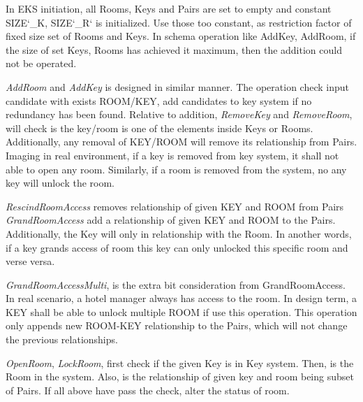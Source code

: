 In EKS initiation, all Rooms, Keys and Pairs are set to empty and constant SIZE\char`_K, SIZE\char`_R` is initialized. Use those too constant, as restriction factor of fixed size set of Rooms and Keys. In schema operation like AddKey, AddRoom, if the size of set Keys, Rooms has achieved it maximum, then the addition could not be operated. 

\textit{AddRoom} and \textit{AddKey} is designed in similar manner. The operation check input candidate with exists ROOM/KEY, add candidates to key system if no redundancy has been found. 
Relative to addition, \textit{RemoveKey} and \textit{RemoveRoom}, will check is the key/room is one of the elements inside Keys or Rooms. Additionally, any removal of KEY/ROOM will remove its relationship from Pairs. Imaging in real environment, if a key is removed from key system, it shall not able to open any room. Similarly, if a room is removed from the system, no any key will unlock the room. 

\textit{RescindRoomAccess} removes relationship of given KEY and ROOM from Pairs
\textit{GrandRoomAccess} add a relationship of given KEY and ROOM to the Pairs. Additionally, the Key will only in relationship with the Room. In another words, if a key grands access of room this key can only unlocked this specific room and verse versa. 

\textit{GrandRoomAccessMulti}, is the extra bit consideration from GrandRoomAccess. In real scenario, a hotel manager always has access to the room. In design term, a KEY shall be able to unlock multiple ROOM if use this operation. This operation only appends new ROOM-KEY relationship to the Pairs, which will not change the previous relationships.

\textit{OpenRoom}, \textit{LockRoom}, first check if the given Key is in Key system. Then, is the Room in the system. Also, is the relationship of given key and room being subset of Pairs. If all above have pass the check, alter the status of room. 

